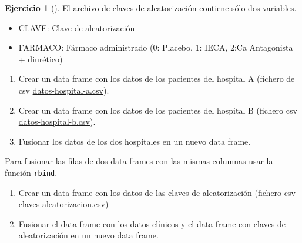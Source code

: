 \documentclass[
  a4paper,
]{scrreport}
\providecommand{\tightlist}{%
  \setlength{\itemsep}{0pt}\setlength{\parskip}{0pt}}\usepackage{longtable,booktabs,array}
\theoremstyle{definition}
\newtheorem{exercise}{Ejercicio}[chapter]
\theoremstyle{remark}
\begin{document}
\begin{exercise}[]
El archivo de claves de aleatorización contiene sólo dos variables.

\begin{itemize}
\tightlist
\item
  CLAVE: Clave de aleatorización
\item
  FARMACO: Fármaco administrado (0: Placebo, 1: IECA, 2:Ca Antagonista +
  diurético)
\end{itemize}

\begin{enumerate}
\def\labelenumi{\alph{enumi}.}
\item
  Crear un data frame con los datos de los pacientes del hospital A
  (fichero de csv
  \href{datos/hipertension/datos-hospital-a.csv}{datos-hospital-a.csv}).
\item
  Crear un data frame con los datos de los pacientes del hospital B
  (fichero csv
  \href{datos/hipertension/datos-hospital-b.csv}{datos-hospital-b.csv}).
\item
  Fusionar los datos de los dos hospitales en un nuevo data frame.
\end{enumerate}

\begin{tcolorbox}[enhanced jigsaw, coltitle=black, breakable, bottomtitle=1mm, colbacktitle=quarto-callout-note-color!10!white, rightrule=.15mm, opacityback=0, opacitybacktitle=0.6, left=2mm, colframe=quarto-callout-note-color-frame, title=\textcolor{quarto-callout-note-color}{\faInfo}\hspace{0.5em}{Ayuda}, toprule=.15mm, toptitle=1mm, arc=.35mm, colback=white, titlerule=0mm, bottomrule=.15mm, leftrule=.75mm]

Para fusionar las filas de dos data frames con las mismas columnas usar
la función
\href{https://aprendeconalf.es/manual-r/03-tipos-datos-estructurados.html\#a\%C3\%B1adir-elementos-a-un-data-frame}{\texttt{rbind}}.

\end{tcolorbox}

\begin{enumerate}
\def\labelenumi{\alph{enumi}.}
\setcounter{enumi}{3}
\item
  Crear un data frame con los datos de las claves de aleatorización
  (fichero csv
  \href{datos/hipertension/claves-aleatorizacion.csv}{claves-aleatorizacion.csv})
\item
  Fusionar el data frame con los datos clínicos y el data frame con
  claves de aleatorización en un nuevo data frame.
\end{enumerate}


\end{exercise}
\end{document}
